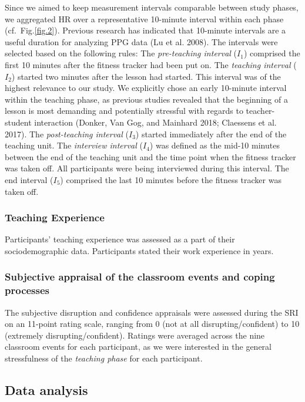 \documentclass[preprint,
3p]{elsarticle} %
\begin{document}
Since we aimed to keep measurement intervals comparable between study
phases, we aggregated HR over a representative 10-minute interval within
each phase (cf.~Fig.\ref{fig.2}). Previous research has indicated that
10-minute intervals are a useful duration for analyzing PPG data (Lu et
al. 2008). The intervals were selected based on the following rules: The
\emph{pre-teaching interval} (\(I_1\)) comprised the first 10 minutes
after the fitness tracker had been put on. The \emph{teaching interval}
(\(I_2\)) started two minutes after the lesson had started. This
interval was of the highest relevance to our study. We explicitly chose
an early 10-minute interval within the teaching phase, as previous
studies revealed that the beginning of a lesson is most demanding and
potentially stressful with regards to teacher-student interaction
(Donker, Van Gog, and Mainhard 2018; Claessens et al. 2017). The
\emph{post-teaching interval} (\(I_3\)) started immediately after the
end of the teaching unit. The \emph{interview interval} (\(I_4\)) was
defined as the mid-10 minutes between the end of the teaching unit and
the time point when the fitness tracker was taken off. All participants
were being interviewed during this interval. The end interval (\(I_5\))
comprised the last 10 minutes before the fitness tracker was taken off.

\subsubsection{Teaching Experience}\label{teaching-experience}

Participants' teaching experience was assessed as a part of their
sociodemographic data. Participants stated their work experience in
years.

\subsubsection{Subjective appraisal of the classroom events and coping
processes}\label{subjective-appraisal-of-the-classroom-events-and-coping-processes}

The subjective disruption and confidence appraisals were assessed during
the SRI on an 11-point rating scale, ranging from 0 (not at all
disrupting/confident) to 10 (extremely disrupting/confident). Ratings
were averaged across the nine classroom events for each participant, as
we were interested in the general stressfulness of the \emph{teaching
phase} for each participant.

\subsection{Data analysis}\label{data-analysis}
\end{document}

